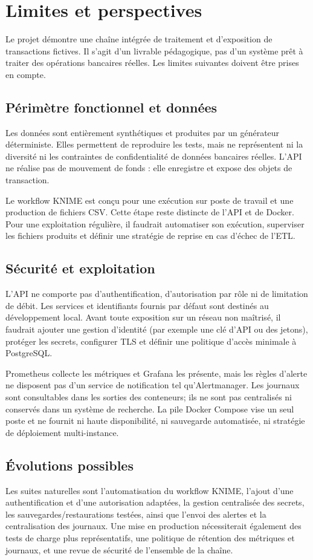 \chapter{Limites et perspectives}\label{chap:limites}

Le projet démontre une chaîne intégrée de traitement et d'exposition de transactions fictives.
Il s'agit d'un livrable pédagogique, pas d'un système prêt à traiter des opérations bancaires
réelles. Les limites suivantes doivent être prises en compte.

\section{Périmètre fonctionnel et données}
Les données sont entièrement synthétiques et produites par un générateur déterministe. Elles
permettent de reproduire les tests, mais ne représentent ni la diversité ni les contraintes de
confidentialité de données bancaires réelles. L'API ne réalise pas de mouvement de fonds : elle
enregistre et expose des objets de transaction.

Le workflow KNIME est conçu pour une exécution sur poste de travail et une production de fichiers
CSV. Cette étape reste distincte de l'API et de Docker. Pour une exploitation régulière, il faudrait
automatiser son exécution, superviser les fichiers produits et définir une stratégie de reprise en
cas d'échec de l'ETL.

\section{Sécurité et exploitation}
L'API ne comporte pas d'authentification, d'autorisation par rôle ni de limitation de débit. Les
services et identifiants fournis par défaut sont destinés au développement local. Avant toute
exposition sur un réseau non maîtrisé, il faudrait ajouter une gestion d'identité (par exemple une
clé d'API ou des jetons), protéger les secrets, configurer TLS et définir une politique d'accès
minimale à PostgreSQL.

Prometheus collecte les métriques et Grafana les présente, mais les règles d'alerte ne disposent
pas d'un service de notification tel qu'Alertmanager. Les journaux sont consultables dans les
sorties des conteneurs; ils ne sont pas centralisés ni conservés dans un système de recherche.
La pile Docker Compose vise un seul poste et ne fournit ni haute disponibilité, ni sauvegarde
automatisée, ni stratégie de déploiement multi-instance.

\section{Évolutions possibles}
Les suites naturelles sont l'automatisation du workflow KNIME, l'ajout d'une authentification et
d'une autorisation adaptées, la gestion centralisée des secrets, les sauvegardes/restaurations
testées, ainsi que l'envoi des alertes et la centralisation des journaux. Une mise en production
nécessiterait également des tests de charge plus représentatifs, une politique de rétention des
métriques et journaux, et une revue de sécurité de l'ensemble de la chaîne.